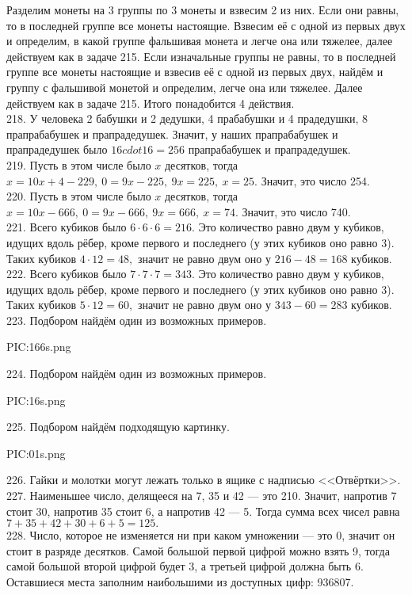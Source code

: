 Разделим монеты на 3 группы по 3 монеты и взвесим 2 из них. Если они равны, то в последней группе все монеты настоящие. Взвесим её с одной из первых двух и определим, в какой группе фальшивая монета и легче она или тяжелее, далее действуем как в задаче 215. Если изначальные группы не равны, то в последней группе все монеты настоящие и взвесив её с одной из первых двух, найдём и группу с фальшивой монетой и определим, легче она или тяжелее. Далее действуем как в задаче 215. Итого понадобится 4 действия.\\
218. У человека 2 бабушки и 2 дедушки, 4 прабабушки и 4 прадедушки, 8 прапрабабушек и прапрадедушек. Значит, у наших прапрабабушек и прапрадедушек было $16cdot16=256$ прапрабабушек и прапрадедушек.\\
219. Пусть в этом числе было $x$ десятков, тогда $x=10x+4-229,\ 0=9x-225,\ 9x=225,\ x=25.$ Значит, это число 254.\\
220. Пусть в этом числе было $x$ десятков, тогда $x=10x-666,\ 0=9x-666,\ 9x=666,\ x=74.$ Значит, это число 740.\\
221. Всего кубиков было $6\cdot6\cdot6=216.$ Это количество равно двум у кубиков, идущих вдоль рёбер, кроме первого и последнего (у этих кубиков оно равно 3).
Таких кубиков $4\cdot12=48,$ значит не равно двум оно у $216-48=168$ кубиков.\\
222. Всего кубиков было $7\cdot7\cdot7=343.$ Это количество равно двум у кубиков, идущих вдоль рёбер, кроме первого и последнего (у этих кубиков оно равно 3).
Таких кубиков $5\cdot12=60,$ значит не равно двум оно у $343-60=283$ кубиков.\\
223. Подбором найдём один из возможных примеров.
\begin{center}
{{PIC:166s.png}}
\end{center}
224. Подбором найдём один из возможных примеров.
\begin{center}
{{PIC:16s.png}}
\end{center}
225. Подбором найдём подходящую картинку.
\begin{center}
{{PIC:01s.png}}
\end{center}
226. Гайки и молотки могут лежать только в ящике с надписью <<Отвёртки>>.\\
227. Наименьшее число, делящееся на 7, 35 и 42 --- это 210. Значит, напротив 7 стоит 30, напротив 35 стоит 6, а напротив 42 --- 5. Тогда сумма всех чисел равна $7+35+42+30+6+5=125.$\\
228. Число, которое не изменяется ни при каком умножении --- это 0, значит он стоит в разряде десятков. Самой большой первой цифрой можно взять 9, тогда самой большой второй цифрой будет 3, а третьей цифрой должна быть 6. Оставшиеся места заполним наибольшими из доступных цифр: 936807.\\
